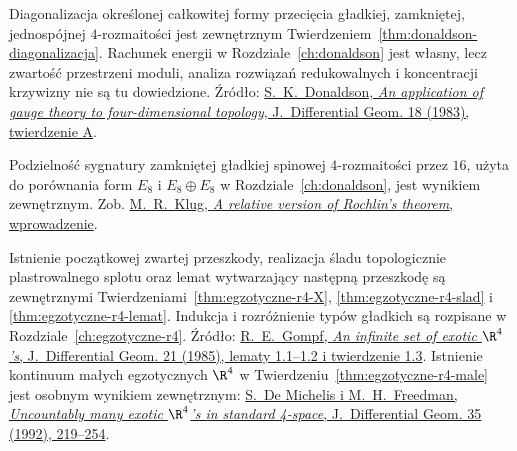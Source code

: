 \begin{description}[leftmargin=2.9cm,style=nextline]
\item[Twierdzenie Donaldsona i analiza równań ASD.]
  Diagonalizacja określonej całkowitej formy przecięcia
  gładkiej, zamkniętej, jednospójnej $4$-rozmaitości
  jest zewnętrznym Twierdzeniem~\ref{thm:donaldson-diagonalizacja}.
  Rachunek energii w Rozdziale~\ref{ch:donaldson} jest własny,
  lecz zwartość przestrzeni moduli, analiza rozwiązań
  redukowalnych i koncentracji krzywizny nie są tu dowiedzione.
  Źródło:
  \href{https://doi.org/10.4310/jdg/1214437665}
  {S.~K.~Donaldson, \emph{An application of gauge theory
  to four-dimensional topology}, J.~Differential Geom. 18
  (1983), twierdzenie A}.

\item[Twierdzenie Rokhlina.]
  Podzielność sygnatury zamkniętej gładkiej
  spinowej $4$-rozmaitości przez $16$, użyta do
  porównania form $E_8$ i $E_8\oplus E_8$ w
  Rozdziale~\ref{ch:donaldson}, jest wynikiem
  zewnętrznym. Zob.
  \href{https://arxiv.org/pdf/2011.12418}
  {M.~R.~Klug, \emph{A relative version of Rochlin's
  theorem}, wprowadzenie}.

\item[Egzotyczne struktury gładkie na $\R^4$.]
  Istnienie początkowej zwartej przeszkody, realizacja
  śladu topologicznie plastrowalnego splotu oraz
  lemat wytwarzający następną przeszkodę są zewnętrznymi
  Twierdzeniami~\ref{thm:egzotyczne-r4-X},
  \ref{thm:egzotyczne-r4-slad} i
  \ref{thm:egzotyczne-r4-lemat}. Indukcja i rozróżnienie
  typów gładkich są rozpisane w
  Rozdziale~\ref{ch:egzotyczne-r4}.
  Źródło:
  \href{https://doi.org/10.4310/jdg/1214439566}
  {R.~E.~Gompf, \emph{An infinite set of exotic
  $\R^4$'s}, J.~Differential Geom. 21 (1985),
  lematy 1.1--1.2 i twierdzenie 1.3}.
  Istnienie kontinuum małych egzotycznych $\R^4$
  w Twierdzeniu~\ref{thm:egzotyczne-r4-male}
  jest osobnym wynikiem zewnętrznym:
  \href{https://doi.org/10.4310/jdg/1214447810}
  {S.~De Michelis i M.~H.~Freedman,
  \emph{Uncountably many exotic $\R^4$'s in
  standard 4-space}, J.~Differential Geom. 35
  (1992), 219--254}.
\end{description}
